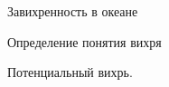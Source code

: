 \begin{chapter}{Завихренность в океане}
\begin{section}{Определение понятия вихря}
\begin{paragraph}{Потенциальный вихрь.}


\end{paragraph}
\end{section}
\end{chapter}
